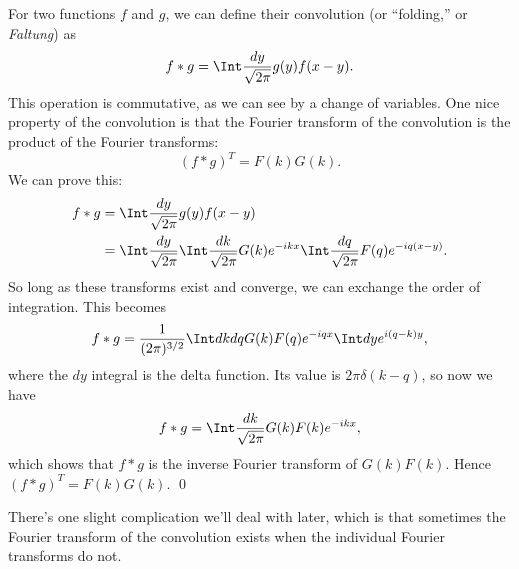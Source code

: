 For two functions $f$ and $g$, we can define their convolution (or ``folding,'' or \emph{Faltung}) as
\begin{equation}
    f*g = \Int \frac{dy}{\sqrt{2\pi}} g(y) f(x-y).
\end{equation}
This operation is commutative, as we can see by a change of variables. One nice property of the convolution is that the Fourier transform of the convolution is the product of the Fourier transforms:
\begin{equation}
    (f*g)^T = F(k) G(k).
\end{equation}
We can prove this:
\begin{align}
    f*g &= \Int \frac{dy}{\sqrt{2\pi}} g(y) f(x-y)\\
        &= \Int \frac{dy}{\sqrt{2\pi}} \Int \frac{dk}{\sqrt{2\pi}} G(k) e^{-ikx} \Int \frac{dq}{\sqrt{2\pi}} F(q) e^{-iq(x-y)}.
\end{align}
So long as these transforms exist and converge, we can exchange the order of integration. This becomes
\begin{equation}
    f*g = \frac{1}{(2\pi)^{3/2}}\Int dk dq G(k) F(q) e^{-iqx} \Int dy e^{i(q-k)y},
\end{equation}
where the $dy$ integral is the delta function. Its value is $2\pi \delta(k-q)$, so now we have
\begin{equation}
    f*g = \Int \frac{dk}{\sqrt{2\pi}} G(k) F(k) e^{-ikx},
\end{equation}
which shows that $f*g$ is the inverse Fourier transform of $G(k)F(k)$. Hence $(f*g)^T = F(k) G(k)$. \qed

There's one slight complication we'll deal with later, which is that sometimes the Fourier transform of the convolution exists when the individual Fourier transforms do not.
